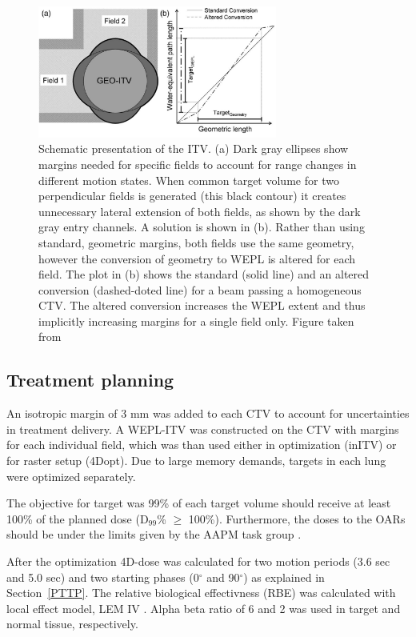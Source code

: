 \documentclass[type=dr, dr=rernat, accentcolor=tud7b,colorbacktitle, bigchapter, openright, twoside, 12pt ]{tudthesis}
\begin{document}
\begin{figure}[H]
	\begin{center}
		\includegraphics[width=0.7\textwidth]{./Images/weplITV.png}
		\caption{Schematic presentation of the ITV. (a) Dark gray ellipses show margins needed for specific fields to account for range changes in different motion states.
		When common target volume for two perpendicular fields is generated (this black contour) it creates unnecessary lateral extension of both fields, as shown by the dark gray
		entry channels. A solution is shown in (b). Rather than using standard, geometric margins, both fields use the same geometry, however the conversion of geometry to WEPL
		is altered for each field. The plot in (b) shows the standard (solid line) and an altered conversion (dashed-doted line) for a beam passing a homogeneous CTV. The altered conversion
		increases the WEPL extent and thus implicitly increasing margins for a single field only. Figure taken from \cite{Graeff2012}}
		\label{Fig:weplITV}
	\end{center}
\end{figure}

\subsection{Treatment planning}

An isotropic margin of 3 mm was added to each CTV to account for uncertainties in treatment delivery. A WEPL-ITV was constructed on the CTV with margins for each individual field, which was than used either in optimization (inITV)
or for raster setup (4Dopt). Due to large memory demands, targets in each lung were optimized separately. 
  
The objective for target was 99\% of each target volume should receive at least 100\% of the planned dose (D$_{99}$\% $\geq$ 100\%). Furthermore, the doses to the OARs should be under the limits given by the AAPM task group \cite{Benedict2010}. 
 
After the optimization 4D-dose was calculated for two motion periods (3.6 sec and 5.0 sec) and two starting phases (0$^\circ$ and 90$^\circ$) as explained in Section~\ref{PTTP}. The relative biological
effectivness (RBE) was calculated with local effect model, LEM IV \cite{Elsaesser2010}. Alpha beta ratio of 6 and 2 was used in target and normal tissue, respectively.
\end{document}
